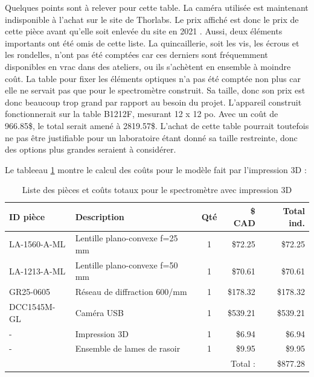 \documentclass[11pt,letterpaper]{article}
\begin{document}
Quelques points sont à relever pour cette table. La caméra utilisée est maintenant indisponible
à l'achat sur le site de Thorlabs. Le prix affiché est donc le prix de cette pièce avant
qu'elle soit enlevée du site en 2021 \cite{noauthor_thorlabs_2021}. Aussi, deux éléments importants
ont été omis de cette liste. La quincaillerie, soit les vis, les écrous et les 
rondelles, n'ont pas été comptées car ces derniers sont fréquemment disponibles en vrac dans
des ateliers, ou ils s'achètent en ensemble à moindre coût. La table pour fixer les éléments 
optiques n'a pas été comptée non plus car elle ne servait pas que pour le spectromètre 
construit. Sa taille, donc son prix est donc beaucoup trop grand par rapport au besoin du projet. L'appareil
construit fonctionnerait sur la table B1212F, mesurant 12 x 12 po. Avec un coût de 966.85\$,
le total serait amené à 2819.57\$. L'achat de cette table pourrait toutefois ne pas être 
justifiable pour un laboratoire étant donné sa taille restreinte, donc des options plus grandes
seraient à considérer.


Le tableeau \ref{prix_3D} montre le calcul des coûts pour le modèle fait par l'impression 3D :

\begin{table}[!ht]
    \centering
    \caption{Liste des pièces et coûts totaux pour le spectromètre avec impression 3D \cite{noauthor_thorlabs_2024} \cite{noauthor_razor_2024}}
    \begin{tabular}{|l|l|c|r|r|}
    \hline
        ID pièce & Description & Qté & \$ CAD & Total ind. \\ \hline\hline
        LA-1560-A-ML & Lentille plano-convexe f=25 mm & 1 & \$72.25 & \$72.25 \\ \hline
        LA-1213-A-ML & Lentille plano-convexe f=50 mm & 1 & \$70.61 & \$70.61 \\ \hline
        GR25-0605 & Réseau de diffraction 600/mm & 1 & \$178.32 & \$178.32 \\ \hline
        DCC1545M-GL & Caméra USB & 1 & \$539.21 & \$539.21 \\ \hline
        - & Impression 3D & 1 & \$6.94 & \$6.94 \\ \hline
        - & Ensemble de lames de rasoir & 1 & \$9.95 & \$9.95 \\ \hline\hline
        ~ & ~ & ~ & Total : & \$877.28 \\ \hline
    \end{tabular}
    \label{prix_3D}
\end{table}
\end{document}

